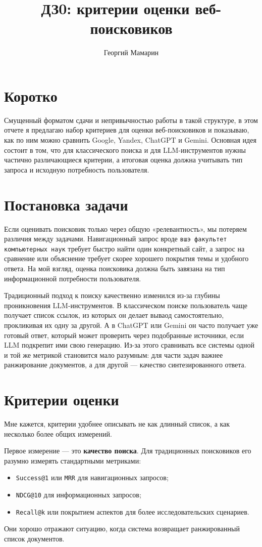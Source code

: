 \documentclass[10pt]{article}
\title{ДЗ0: критерии оценки веб-поисковиков}
\author{Георгий Мамарин}
\begin{document}
\maketitle

\section{Коротко}
Смущенный форматом сдачи и непривычностью работы в такой структуре, в этом отчете я предлагаю набор критериев для оценки веб-поисковиков и показываю, как по ним можно сравнить Google, Yandex, ChatGPT и Gemini. Основная идея состоит в том, что для классического поиска и для LLM-инструментов нужны частично различающиеся критерии, а итоговая оценка должна учитывать тип запроса и исходную потребность пользователя.

\section{Постановка задачи}
Если оценивать поисковик только через общую «релевантность», мы потеряем различия между задачами. Навигационный запрос вроде \texttt{вшэ факультет компьютерных наук} требует быстро найти один конкретный сайт, а запрос на сравнение или объяснение требует скорее хорошего покрытия темы и удобного ответа. На мой взгляд, оценка поисковика должна быть завязана на тип информационной потребности пользователя.

Традиционный подход к поиску качественно изменился из-за глубины проникновения LLM-инструментов. В классическом поиске пользователь чаще получает список ссылок, из которых он делает вываод самостоятельно, прокликивая их одну за другой. А в ChatGPT или Gemini он часто получает уже готовый ответ, который может проверить через подобранные источники, если LLM подкрепит ими свою генерацию. Из-за этого сравнивать все системы одной и той же метрикой становится мало разумным: для части задач важнее ранжирование документов, а для другой --- качество синтезированного ответа.

\section{Критерии оценки}
Мне кажется, критерии удобнее описывать не как длинный список, а как несколько более общих измерений.

Первое измерение --- это \textbf{качество поиска}. Для традиционных поисковиков его разумно измерять стандартными метриками:
\begin{itemize}
\item \texttt{Success@1} или \texttt{MRR} для навигационных запросов;
\item \texttt{NDCG@10} для информационных запросов;
\item \texttt{Recall@k} или покрытием аспектов для более исследовательских сценариев.
\end{itemize}
Они хорошо отражают ситуацию, когда система возвращает ранжированный список документов.
\end{document}
